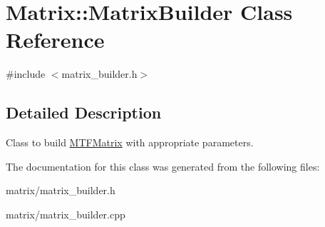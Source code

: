 \hypertarget{classMatrix_1_1MatrixBuilder}{\section{Matrix\-:\-:Matrix\-Builder Class Reference}
\label{classMatrix_1_1MatrixBuilder}
}


{\ttfamily \#include $<$matrix\-\_\-builder.\-h$>$}



\subsection{Detailed Description}
Class to build \hyperlink{classMatrix_1_1MTFMatrix}{M\-T\-F\-Matrix} with appropriate parameters. 

The documentation for this class was generated from the following files\-:\begin{DoxyCompactItemize}
\item 
matrix/matrix\-\_\-builder.\-h\item 
matrix/matrix\-\_\-builder.\-cpp\end{DoxyCompactItemize}
